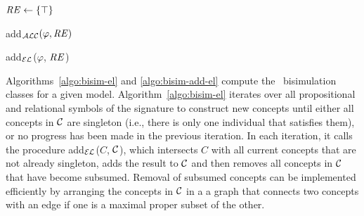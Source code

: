 \begin{algorithm}[t]
\dontprintsemicolon
\caption{}
\label{algo:bisim-alc}

$\mathit{RE} \leftarrow \{\top\}$


 
\end{algorithm}

\begin{algorithm}
\caption{add$_\mathcal{ALC}(\varphi,\mathit{RE})$}
\end{algorithm}


\begin{algorithm}[t]
\dontprintsemicolon
\caption{add$_\mathcal{EL}$($\varphi$, $\mathit{RE}$)}
\label{algo:bisim-add-el}
\end{algorithm}

Algorithms~\ref{algo:bisim-el} and \ref{algo:bisim-add-el} compute
the \el\ bisimulation classes for a given model.
Algorithm~\ref{algo:bisim-el} iterates over all propositional and
relational symbols of the signature to construct new concepts until
either all concepts in $\mathcal{C}$ are singleton (i.e., there is only one
individual that satisfies them), or no progress has been made in the
previous iteration.  In each iteration, it calls the procedure
add$_\mathcal{EL}$($C$, $\mathcal{C}$), which intersects $C$ with all current concepts
that are not already singleton, adds the result to $\mathcal{C}$ and then
removes all concepts in $\mathcal{C}$ that have become subsumed.  Removal of
subsumed concepts can be implemented efficiently by arranging the
concepts in $\mathcal{C}$ in a a graph that connects two concepts with an edge
if one is a maximal proper subset of the other.

